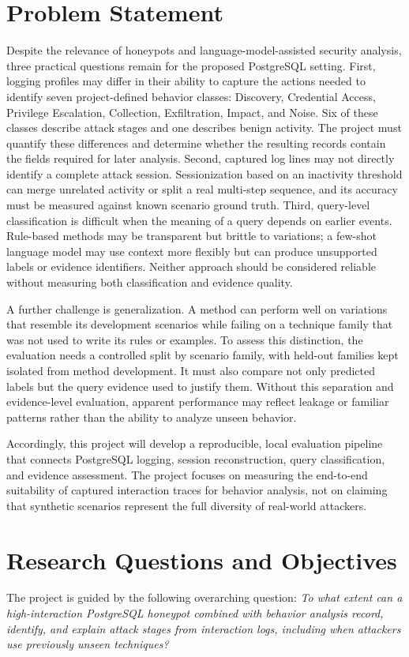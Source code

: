 \documentclass[12pt,a4paper]{report}
\begin{document}
\section{Problem Statement}
Despite the relevance of honeypots and language-model-assisted security analysis, three practical questions remain for the proposed PostgreSQL setting. First, logging profiles may differ in their ability to capture the actions needed to identify seven project-defined behavior classes: Discovery, Credential Access, Privilege Escalation, Collection, Exfiltration, Impact, and Noise. Six of these classes describe attack stages and one describes benign activity. The project must quantify these differences and determine whether the resulting records contain the fields required for later analysis. Second, captured log lines may not directly identify a complete attack session. Sessionization based on an inactivity threshold can merge unrelated activity or split a real multi-step sequence, and its accuracy must be measured against known scenario ground truth. Third, query-level classification is difficult when the meaning of a query depends on earlier events. Rule-based methods may be transparent but brittle to variations; a few-shot language model may use context more flexibly but can produce unsupported labels or evidence identifiers. Neither approach should be considered reliable without measuring both classification and evidence quality.

A further challenge is generalization. A method can perform well on variations that resemble its development scenarios while failing on a technique family that was not used to write its rules or examples. To assess this distinction, the evaluation needs a controlled split by scenario family, with held-out families kept isolated from method development. It must also compare not only predicted labels but the query evidence used to justify them. Without this separation and evidence-level evaluation, apparent performance may reflect leakage or familiar patterns rather than the ability to analyze unseen behavior.

Accordingly, this project will develop a reproducible, local evaluation pipeline that connects PostgreSQL logging, session reconstruction, query classification, and evidence assessment. The project focuses on measuring the end-to-end suitability of captured interaction traces for behavior analysis, not on claiming that synthetic scenarios represent the full diversity of real-world attackers.

\section{Research Questions and Objectives}
The project is guided by the following overarching question: \textit{To what extent can a high-interaction PostgreSQL honeypot combined with behavior analysis record, identify, and explain attack stages from interaction logs, including when attackers use previously unseen techniques?}
\end{document}
